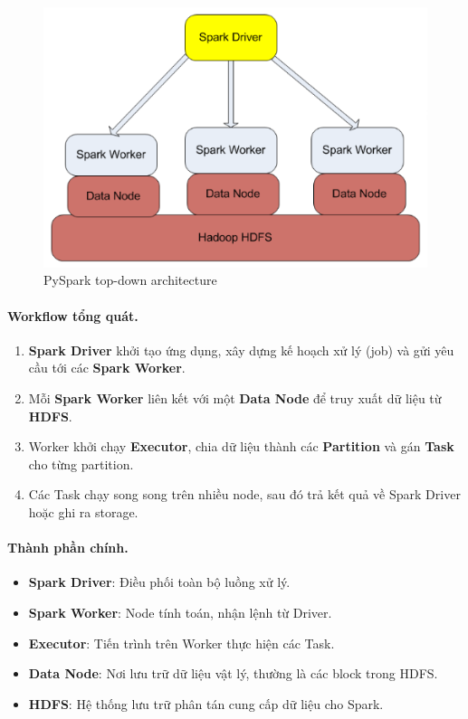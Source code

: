 \documentclass[11pt]{article}
\begin{document}
\begin{figure}[H]
    \centering
    \includegraphics[width=0.65\linewidth]{pySpark_highlevel.png}
    \caption{PySpark top-down architecture}
\end{figure}

\paragraph{Workflow tổng quát.}
\begin{enumerate}
    \item \textbf{Spark Driver} khởi tạo ứng dụng, xây dựng kế hoạch xử lý (job) và gửi yêu cầu tới các \textbf{Spark Worker}.
    \item Mỗi \textbf{Spark Worker} liên kết với một \textbf{Data Node} để truy xuất dữ liệu từ \textbf{HDFS}.
    \item Worker khởi chạy \textbf{Executor}, chia dữ liệu thành các \textbf{Partition} và gán \textbf{Task} cho từng partition.
    \item Các Task chạy song song trên nhiều node, sau đó trả kết quả về Spark Driver hoặc ghi ra storage.
\end{enumerate}

\paragraph{Thành phần chính.}
\begin{itemize}
    \item \textbf{Spark Driver}: Điều phối toàn bộ luồng xử lý.
    \item \textbf{Spark Worker}: Node tính toán, nhận lệnh từ Driver.
    \item \textbf{Executor}: Tiến trình trên Worker thực hiện các Task.
    \item \textbf{Data Node}: Nơi lưu trữ dữ liệu vật lý, thường là các block trong HDFS.
    \item \textbf{HDFS}: Hệ thống lưu trữ phân tán cung cấp dữ liệu cho Spark.
\end{itemize}
\end{document}
